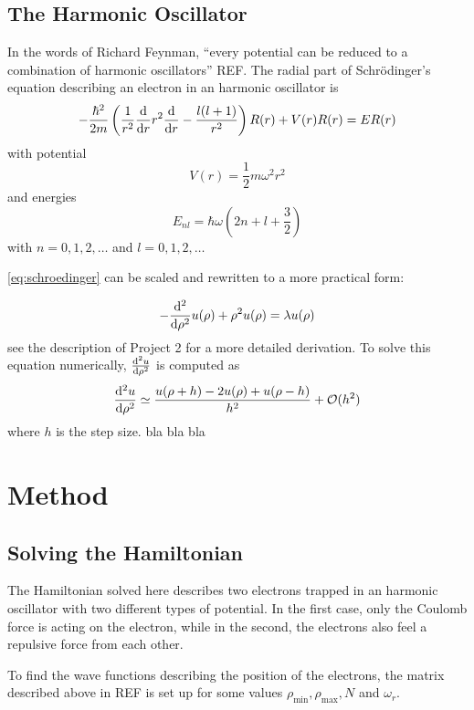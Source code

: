 \documentclass[aps,reprint]{revtex4-1}
\begin{document}
\subsection{The Harmonic Oscillator}
\label{sec:harmonic}
In the words of Richard Feynman, ``every potential can be reduced to a
combination of harmonic oscillators'' REF. The radial part of Schrödinger's
equation describing an electron in an harmonic oscillator is
\begin{equation}
  \label{eq:schroedinger}
  -\frac{\hbar^{2}}{2m} \left( \frac{1}{r^{2}}\dv{r}r^{2}\dv{r} - \frac{l(l+1)}{r^{2}} \right)R(r) + V(r)R(r) = ER(r)
\end{equation}
with potential
\begin{equation*}
  V(r) = \frac{1}{2}mω^{2}r^{2}
\end{equation*}
and energies
\begin{equation*}
  E_{nl} = \hbar\omega\left( 2n+l+\frac{3}{2} \right)
\end{equation*}
with \(n=0,1,2,\ldots\) and \(l = 0,1,2,\ldots\)

\eqref{eq:schroedinger} can be scaled and rewritten to a more practical form:

\begin{equation}
  \label{eq:scaledschroedinger}
  -\dv[2]{\rho}u(\rho)+\rho^{2}u(\rho) = \lambda u(\rho)
\end{equation}
see the description of Project 2 for a more detailed derivation. To solve this equation numerically,
\(\dv[2]{u}{\rho}\) is computed as
\begin{equation*}
  \dv[2]{u}{\rho} \simeq \frac{u(\rho+h)-2u(\rho)+u(\rho-h)}{h^{2}} + \mathcal{O}(h^{2})
\end{equation*}
where \(h\) is the step size.
bla bla bla
\section{Method}
\label{sec:method}

\subsection{Solving the Hamiltonian}
The Hamiltonian solved here describes two electrons trapped in an harmonic oscillator with
two different types of potential. In the first case, only the Coulomb force is
acting on the electron, while in the second, the electrons also feel a repulsive
force from each other.

To find the wave functions describing the position of the electrons, the matrix
described above in REF is set up for some values \(\rho_{\text{min}},
\rho_{\text{max}}, N\) and \(\omega_{r}\).
\end{document}
